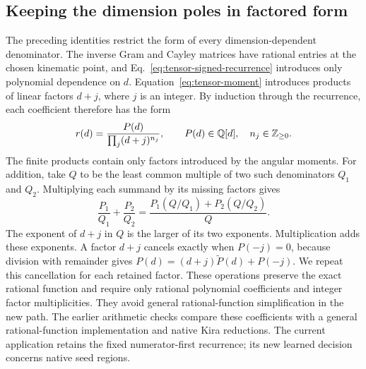 \subsection{Keeping the dimension poles in factored form}
The preceding identities restrict the form of every dimension-dependent denominator. The inverse Gram and Cayley matrices have rational entries at the chosen kinematic point, and Eq.~\eqref{eq:tensor-signed-recurrence} introduces only polynomial dependence on $d$. Equation~\eqref{eq:tensor-moment} introduces products of linear factors $d+j$, where $j$ is an integer. By induction through the recurrence, each coefficient therefore has the form
\begin{equation}
 r(d)=\frac{P(d)}{\prod_j(d+j)^{n_j}},\qquad
 P(d)\in\mathbb Q[d],\quad n_j\in\mathbb Z_{\geq0}.
 \label{eq:tensor-factored-field}
\end{equation}
The finite products contain only factors introduced by the angular moments. For addition, take $Q$ to be the least common multiple of two such denominators $Q_1$ and $Q_2$. Multiplying each summand by its missing factors gives
\begin{equation}
 \frac{P_1}{Q_1}+\frac{P_2}{Q_2}
 =\frac{P_1(Q/Q_1)+P_2(Q/Q_2)}{Q}.
 \label{eq:tensor-factored-add}
\end{equation}
The exponent of $d+j$ in $Q$ is the larger of its two exponents. Multiplication adds these exponents. A factor $d+j$ cancels exactly when $P(-j)=0$, because division with remainder gives $P(d)=(d+j)\widetilde P(d)+P(-j)$. We repeat this cancellation for each retained factor. These operations preserve the exact rational function and require only rational polynomial coefficients and integer factor multiplicities. They avoid general rational-function simplification in the new path. The earlier arithmetic checks compare these coefficients with a general rational-function implementation and native Kira reductions. The current application retains the fixed numerator-first recurrence; its new learned decision concerns native seed regions.
